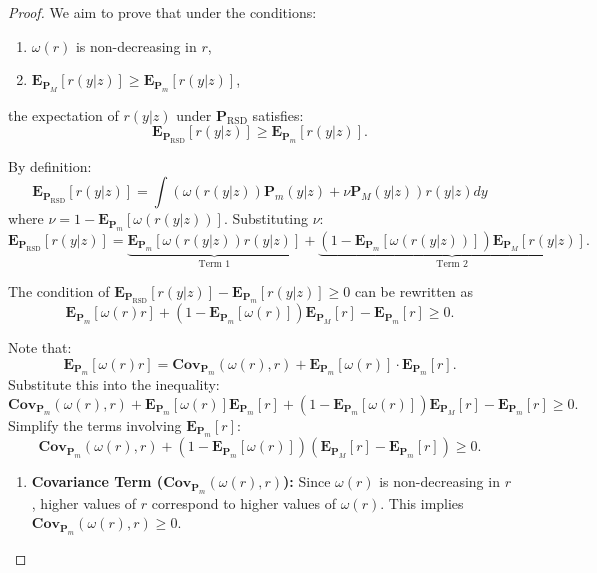 \documentclass{article}
\theoremstyle{plain}
\theoremstyle{definition}
\theoremstyle{remark}
\begin{document}
\begin{proof}
    We aim to prove that under the conditions:
\begin{enumerate}
    \item $\omega(r)$ is non-decreasing in $r$,
    \item $\mathbf{E}_{\mathbf{P}_M}[r(y|z)] \geq \mathbf{E}_{\mathbf{P}_m}[r(y|z)]$,
\end{enumerate}
the expectation of $r(y|z)$ under $\mathbf{P}_{\mathrm{RSD}}$ satisfies:
\[
\mathbf{E}_{\mathbf{P}_{\mathrm{RSD}}}[r(y|z)] \geq \mathbf{E}_{\mathbf{P}_m}[r(y|z)].
\]

By definition:
\[
\mathbf{E}_{\mathbf{P}_{\mathrm{RSD}}}[r(y|z)] = \int \left( \omega(r(y|z)) \mathbf{P}_m(y|z) + \nu \mathbf{P}_M(y|z) \right) r(y|z) dy
\]
where $\nu = 1 - \mathbf{E}_{\mathbf{P}_m}[\omega(r(y|z))]$. Substituting $\nu$:
\[
\mathbf{E}_{\mathbf{P}_{\mathrm{RSD}}}[r(y|z)] = \underbrace{\mathbf{E}_{\mathbf{P}_m}[\omega(r(y|z)) r(y|z)]}_{\text{Term 1}} + \underbrace{(1 - \mathbf{E}_{\mathbf{P}_m}[\omega(r(y|z))]) \mathbf{E}_{\mathbf{P}_M}[r(y|z)]}_{\text{Term 2}}.
\]



The condition of 
$
\mathbf{E}_{\mathbf{P}_{\mathrm{RSD}}}[r(y|z)] - \mathbf{E}_{\mathbf{P}_m}[r(y|z)] \geq 0
$
can be rewritten as 
\[
\mathbf{E}_{\mathbf{P}_m}[\omega(r) r] + (1 - \mathbf{E}_{\mathbf{P}_m}[\omega(r)]) \mathbf{E}_{\mathbf{P}_M}[r] - \mathbf{E}_{\mathbf{P}_m}[r] \geq 0.
\]


Note that:
\[
\mathbf{E}_{\mathbf{P}_m}[\omega(r) r] = \mathbf{Cov}_{\mathbf{P}_m}(\omega(r), r) + \mathbf{E}_{\mathbf{P}_m}[\omega(r)] \cdot \mathbf{E}_{\mathbf{P}_m}[r].
\]
Substitute this into the inequality:
\[
\mathbf{Cov}_{\mathbf{P}_m}(\omega(r), r) + \mathbf{E}_{\mathbf{P}_m}[\omega(r)] \mathbf{E}_{\mathbf{P}_m}[r] + (1 - \mathbf{E}_{\mathbf{P}_m}[\omega(r)]) \mathbf{E}_{\mathbf{P}_M}[r] - \mathbf{E}_{\mathbf{P}_m}[r] \geq 0.
\]
Simplify the terms involving $\mathbf{E}_{\mathbf{P}_m}[r]$:
\[
\mathbf{Cov}_{\mathbf{P}_m}(\omega(r), r) + (1 - \mathbf{E}_{\mathbf{P}_m}[\omega(r)]) \left( \mathbf{E}_{\mathbf{P}_M}[r] - \mathbf{E}_{\mathbf{P}_m}[r] \right) \geq 0.
\]



\begin{enumerate}
    \item \textbf{Covariance Term ($\mathbf{Cov}_{\mathbf{P}_m}(\omega(r), r)$):}  
    Since $\omega(r)$ is non-decreasing in $r$, higher values of $r$ correspond to higher values of $\omega(r)$. This implies $\mathbf{Cov}_{\mathbf{P}_m}(\omega(r), r) \geq 0$.


\end{enumerate}
\end{proof}
\end{document}
